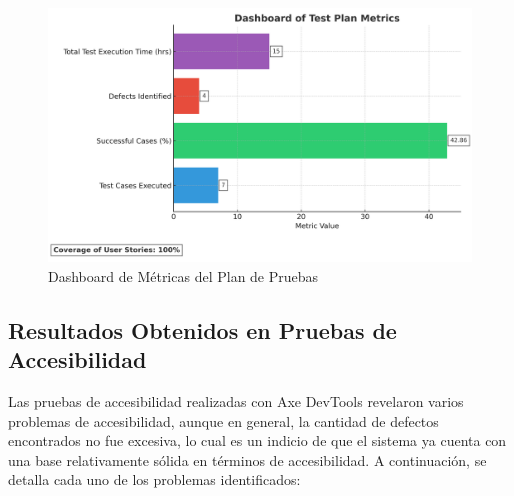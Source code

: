 \documentclass[stu, 12pt, letterpaper, donotrepeattitle, floatsintext, natbib]{apa7}
\begin{document}
\begin{figure}[H]
    \label{fig:dashboard_metrica_pruebas}
    \centering
    \includegraphics[width=\textwidth]{../imgs/dashboard_test_metrics_white_bg.png}
    \caption{Dashboard de Métricas del Plan de Pruebas}
\end{figure}

\subsection{Resultados Obtenidos en Pruebas de Accesibilidad}

\noindent Las pruebas de accesibilidad realizadas con Axe DevTools revelaron varios problemas de accesibilidad, aunque en general, la cantidad de defectos encontrados no fue excesiva, lo cual es un indicio de que el sistema ya cuenta con una base relativamente sólida en términos de accesibilidad. A continuación, se detalla cada uno de los problemas identificados:
\end{document}
